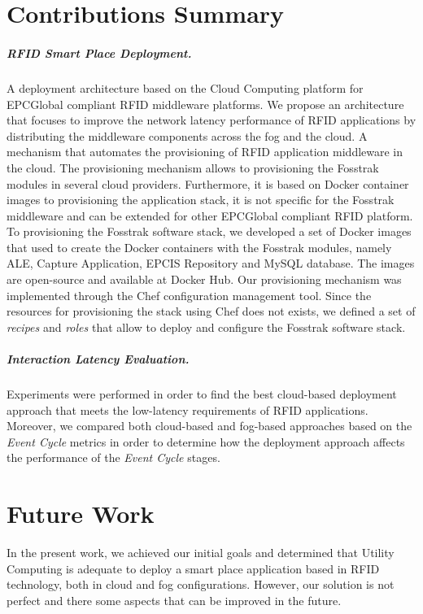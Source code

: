 \section{Contributions Summary}
\label{sec:contributions}

\subparagraph{RFID Smart Place Deployment.}
\label{subp:rfid_smart_place_architecture}
A deployment architecture based on the Cloud Computing platform for EPCGlobal compliant \gls{RFID}
middleware platforms. We propose an architecture that focuses to improve the network latency
performance of \gls{RFID} applications by distributing the middleware components across the fog and
the cloud.
%
A mechanism that automates the provisioning of \gls{RFID} application middleware in the cloud.
The provisioning mechanism allows to provisioning the Fosstrak modules in several cloud
providers. Furthermore, it is based on Docker container images to provisioning the application
stack, it is not specific for the Fosstrak middleware and can be extended for other EPCGlobal
compliant \gls{RFID} platform.
%
To provisioning the Fosstrak software stack, we developed a set of Docker images that used to
create the Docker containers with the Fosstrak modules, namely \gls{ALE}, Capture Application,
\gls{EPCIS} Repository and MySQL database. The images are open-source and available at
Docker Hub.
%
Our provisioning mechanism was implemented through the Chef configuration management tool. Since the
resources for provisioning the stack using Chef does not exists, we defined a set of \textit{recipes}
and \textit{roles} that allow to deploy and configure the Fosstrak software stack.

\subparagraph{Interaction Latency Evaluation.}
\label{subp:event_latency_performance_eval}
Experiments were performed in order to find the best cloud-based deployment approach that meets the
low-latency requirements of \gls{RFID} applications. Moreover, we compared both cloud-based and fog-based
approaches based on the \textit{Event Cycle} metrics in order to determine how the deployment
approach affects the performance of the \textit{Event Cycle} stages.

\section{Future Work}
\label{sec:future_work}
In the present work, we achieved our initial goals and determined that Utility Computing is adequate
to deploy a smart place application based in \gls{RFID} technology, both in cloud and fog configurations.
However, our solution is not perfect and there some aspects that can be improved in the future.

